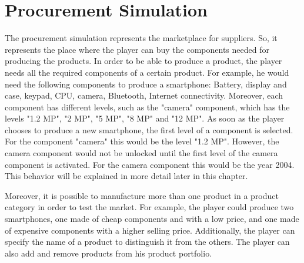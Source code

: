 \section{Procurement Simulation}
\label{procuresim}
The procurement simulation represents the marketplace for suppliers. So, it represents the place where the player can buy the components needed for producing the products. In order to be able to produce a product, the player needs all the required components of a certain product. For example, he would need the following components to produce a smartphone: Battery, display and case, keypad, CPU, camera, Bluetooth, Internet connectivity. Moreover, each component has different levels, such as the "camera" component, which has the levels "1.2 MP", "2 MP", "5 MP", "8 MP" and "12 MP".  As soon as the player chooses to produce a new smartphone, the first level of a component is selected. For the component "camera" this would be the level "1.2 MP". However, the camera component would not be unlocked until the first level of the camera component is activated. For the camera component this would be the year 2004. This behavior will be explained in more detail later in this chapter.

Moreover, it is possible to manufacture more than one product in a product category in order to test the market. For example, the player could produce two smartphones, one made of cheap components and with a low price, and one made of expensive components with a higher selling price. Additionally, the player can specify the name of a product to distinguish it from the others. The player can also add and remove products from his product portfolio.

